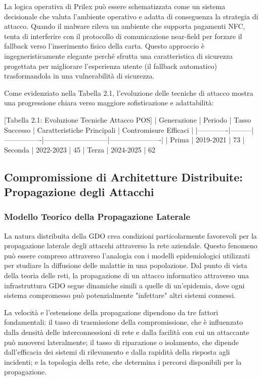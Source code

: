{La logica operativa di Prilex può essere schematizzata come un sistema decisionale che valuta l'ambiente operativo e adatta di conseguenza la strategia di attacco. Quando il malware rileva un ambiente che supporta pagamenti NFC, tenta di interferire con il protocollo di comunicazione near-field per forzare il fallback verso l'inserimento fisico della carta. Questo approccio è ingegneristicamente elegante perché sfrutta una caratteristica di sicurezza progettata per migliorare l'esperienza utente (il fallback automatico) trasformandola in una vulnerabilità di sicurezza.

Come evidenziato nella Tabella 2.1, l'evoluzione delle tecniche di attacco mostra una progressione chiara verso maggiore sofisticazione e adattabilità:

[Tabella 2.1: Evoluzione Tecniche Attacco POS]
| Generazione | Periodo | Tasso Successo | Caratteristiche Principali | Contromisure Efficaci |
|-------------|---------|----------------|---------------------------|----------------------|
| Prima | 2019-2021 | 73%
| Seconda | 2022-2023 | 45%
| Terza | 2024-2025 | 62%

\subsection{Compromissione di Architetture Distribuite: Propagazione degli Attacchi}

\subsubsection{Modello Teorico della Propagazione Laterale}

La natura distribuita della GDO crea condizioni particolarmente favorevoli per la propagazione laterale degli attacchi attraverso la rete aziendale. Questo fenomeno può essere compreso attraverso l'analogia con i modelli epidemiologici utilizzati per studiare la diffusione delle malattie in una popolazione. Dal punto di vista della teoria delle reti, la propagazione di un attacco informatico attraverso una infrastruttura GDO segue dinamiche simili a quelle di un'epidemia, dove ogni sistema compromesso può potenzialmente "infettare" altri sistemi connessi.

La velocità e l'estensione della propagazione dipendono da tre fattori fondamentali: il tasso di trasmissione della compromissione, che è influenzato dalla densità delle interconnessioni di rete e dalla facilità con cui un attaccante può muoversi lateralmente; il tasso di riparazione o isolamento, che dipende dall'efficacia dei sistemi di rilevamento e dalla rapidità della risposta agli incidenti; e la topologia della rete, che determina i percorsi disponibili per la propagazione.

}
